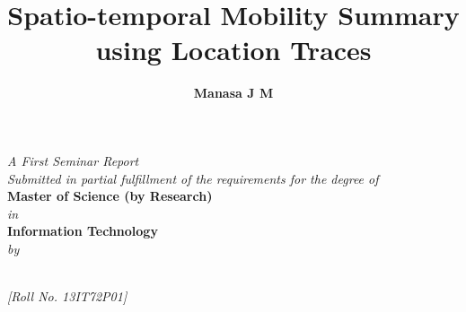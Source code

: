 

\title{\fontsize{16pt}{19.2pt}\selectfont\bf{ Spatio-temporal Mobility Summary using Location Traces }}
\date{}
\maketitle
\thispagestyle{empty}
\begin{center}
\vspace*{-8mm}
\textit{A First Seminar Report\\Submitted in partial fulfillment of the requirements for the degree of \\}
\vspace*{6mm}
{\fontsize{14pt}{16.8pt}\selectfont\textbf{Master of Science (by Research)}} \\ \vspace*{3mm}
{\fontsize{14pt}{16.8pt}\selectfont\textit{in}} \\
\vspace*{3mm}
%
{\fontsize{14pt}{16.8pt}\selectfont\textbf{Information Technology}} \\

\vspace*{2mm}
{\fontsize{14pt}{16.8pt}\selectfont\textit{by}} \\
\vspace*{3mm}

\author{\fontsize{14pt}{16.8pt}\selectfont\textbf{Manasa J M }}\\
\vspace*{2mm}
{\fontsize{12pt}{14.4pt}\selectfont\textit{[Roll No. 13IT72P01]}} \\
\vspace*{3mm}


\end{center}

